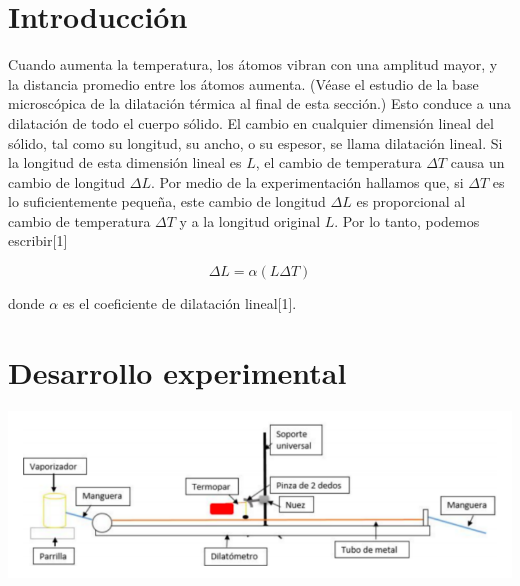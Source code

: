 \documentclass[DIV=calc, paper=a4, fontsize=11pt]{scrartcl}
\newenvironment{Figura}
  {\par\medskip\noindent\minipage{\linewidth}}
  {\endminipage\par\medskip}
\begin{document}
\begin{multicols}{2}




\section*{Introducción}

Cuando aumenta la temperatura, los átomos vibran con una amplitud mayor, y la distancia promedio entre los átomos aumenta. (Véase el estudio de la base microscópica de la dilatación térmica al final de esta sección.) Esto conduce a una dilatación de todo el cuerpo sólido. El cambio en cualquier dimensión lineal del sólido, tal como su longitud, su ancho, o su espesor, se llama dilatación lineal. Si la longitud de esta dimensión lineal es $L$, el cambio de temperatura $\Delta T$ causa un cambio de longitud $\Delta L$. Por medio de la experimentación hallamos que, si $\Delta T$ es lo suficientemente pequeña, este cambio de longitud $\Delta L$ es proporcional al cambio de temperatura $\Delta T$ y a la longitud original $L$. Por lo tanto, podemos escribir[1]


\begin{equation}
    \Delta L = \alpha (L \Delta T)
\end{equation}

donde $\alpha$ es el coeficiente de dilatación lineal[1].


\section*{Desarrollo experimental}

\begin{Figura}
\centering
    \includegraphics[width=1.1\textwidth]{diagrama dilatacion.PNG}
    \label{fig}
\end{Figura}


\end{multicols}
\end{document}
